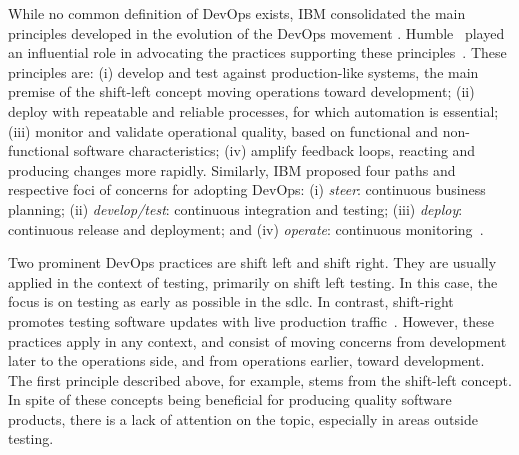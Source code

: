 While no common definition of DevOps exists, IBM consolidated the main principles developed in the evolution of the DevOps movement \cite{sharma-2017-devops-dummies}. Humble~\etal{} played an influential role in advocating the practices supporting these principles~\cite{humble-2006-deployment,humble-2010-continuous,humble-2011-enterprises,kim-2016-devops}. These principles are:
(i) develop and test against production-like systems, the main premise of the shift-left concept moving operations toward development;
(ii)  deploy with repeatable and reliable processes, for which automation is essential;
(iii) monitor and validate operational quality, based on functional and non-functional software characteristics;
(iv) amplify feedback loops, reacting and producing changes more rapidly. Similarly, IBM proposed four paths and respective foci of concerns for adopting DevOps: (i) \textit{steer}: continuous business planning; (ii) \textit{develop/test}: continuous integration and testing; (iii)  \textit{deploy}: continuous release and deployment; and (iv) \textit{operate}: continuous monitoring~\cite{sharma-2017-devops-dummies}.

Two prominent DevOps practices are shift left and shift right. They are usually applied in the context of testing, primarily on shift left testing. In this case, the focus is on testing as early as possible in the \gls{sdlc}. In contrast, shift-right promotes testing software updates with live production traffic~\cite{kaulgud-2016-shiting}. However, these practices apply in any context, and consist of moving concerns from development later to the operations side, and from operations earlier, toward development. The first principle described above, for example, stems from the shift-left concept. In spite of these concepts being beneficial for producing quality software products, there is a lack of attention on the topic, especially in areas outside testing.

